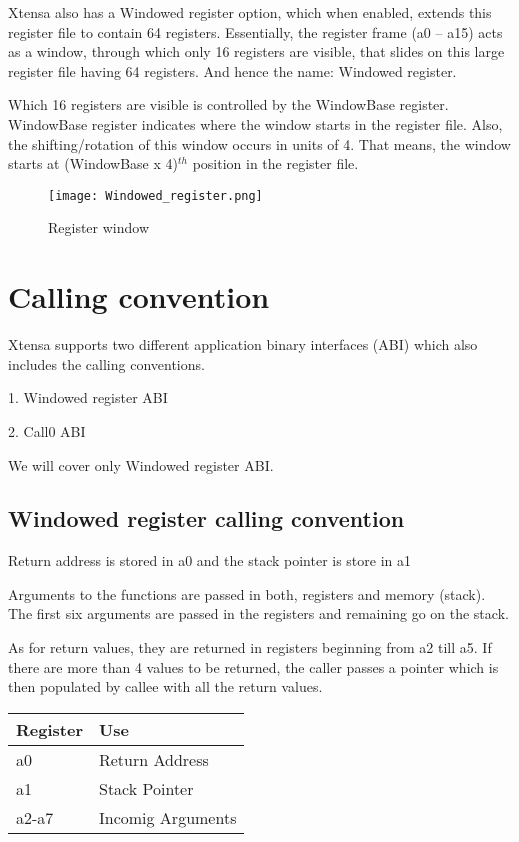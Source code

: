 Xtensa also has a Windowed register option, which when enabled, extends this register file to contain 64 registers. Essentially, the register frame (a0 -- a15) acts as a window, through which only 16 registers are visible, that slides on this large register file having 64 registers. And hence the name: Windowed register.

Which 16 registers are visible is controlled by the WindowBase register. WindowBase register indicates where the window starts in the register file. Also, the shifting/rotation of this window occurs in units of 4. That means, the window starts at (WindowBase x 4)$^{th}$ position in the register file.

\begin{figure}[p]
    \center
    \texttt{[image: Windowed\_register.png]}
    \caption{Register window}
    \label{fig:register-window}
\end{figure}

\section{Calling convention}

 Xtensa supports two different application binary interfaces (ABI) which also includes the calling conventions.
 
1. Windowed register ABI

2. Call0 ABI

We will cover only Windowed register ABI.

\subsection{Windowed register calling convention}

Return address is stored in a0 and the stack pointer is store in a1

Arguments to the functions are passed in both, registers and memory (stack). The first six arguments are passed in the registers and remaining go on the stack.

As for return values, they are returned in registers beginning from a2 till a5. If there are more than 4 values to be returned, the caller passes a pointer which is then populated by callee with all the return values.

\begin{longtable}{|p{5cm}|p{5cm}|}
    \hline
    Register & Use \\
    \hline
    a0 & Return Address\\ \hline
    a1 & Stack Pointer\\ \hline
    a2-a7 & Incomig Arguments\\ \hline
\end{longtable}

